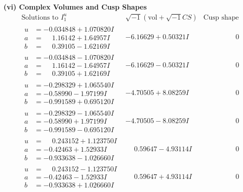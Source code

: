 \documentclass[1p]{elsarticle_modified}
\theoremstyle{definition}
\newcommand{\I}{\sqrt{-1}}
\begin{document}
\newpage\flushleft \textbf{(vi) Complex Volumes and Cusp Shapes}
$$\begin{array}{c|c|c}  
\text{Solutions to }I^u_{1}& \I (\text{vol} + \sqrt{-1}CS) & \text{Cusp shape}\\
 \hline 
\begin{aligned}
u &= -0.034848 + 1.070820 I \\
a &= \phantom{-}1.16142 + 1.64957 I \\
b &= \phantom{-}0.39105 - 1.62169 I\end{aligned}
 & -6.16629 + 0.50321 I & \phantom{-0.000000 } 0 \\ \hline\begin{aligned}
u &= -0.034848 - 1.070820 I \\
a &= \phantom{-}1.16142 - 1.64957 I \\
b &= \phantom{-}0.39105 + 1.62169 I\end{aligned}
 & -6.16629 - 0.50321 I & \phantom{-0.000000 } 0 \\ \hline\begin{aligned}
u &= -0.298329 + 1.065540 I \\
a &= -0.58990 - 1.97199 I \\
b &= -0.991589 + 0.695120 I\end{aligned}
 & -4.70505 + 8.08259 I & \phantom{-0.000000 } 0 \\ \hline\begin{aligned}
u &= -0.298329 - 1.065540 I \\
a &= -0.58990 + 1.97199 I \\
b &= -0.991589 - 0.695120 I\end{aligned}
 & -4.70505 - 8.08259 I & \phantom{-0.000000 } 0 \\ \hline\begin{aligned}
u &= \phantom{-}0.243152 + 1.123750 I \\
a &= -0.42463 + 1.52933 I \\
b &= -0.933638 - 1.026660 I\end{aligned}
 & \phantom{-}0.59647 - 4.93114 I & \phantom{-0.000000 } 0 \\ \hline\begin{aligned}
u &= \phantom{-}0.243152 - 1.123750 I \\
a &= -0.42463 - 1.52933 I \\
b &= -0.933638 + 1.026660 I\end{aligned}
 & \phantom{-}0.59647 + 4.93114 I & \phantom{-0.000000 } 0 \\ \hline\begin{aligned}

\end{aligned}
\end{array}$$
\end{document}
